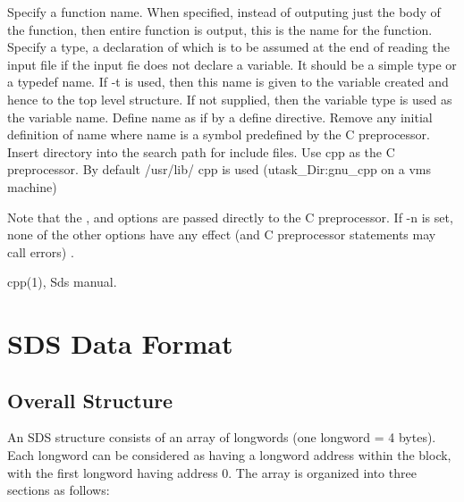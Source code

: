 \begin{manroutinedescription}
\begin{mandescription}
Specify a function name.  When specified, %
instead of
             outputing just the body of the function, then entire
             function is output, this is the name for the function.
Specify a type, a declaration of which is to be %
assumed
             at the end of reading the input file if the input fie
             does not declare a variable.  It should be a simple type
             or a typedef name.
If -t is used, then this name is given to the %
variable
             created and hence to the top level structure.  If not supplied,
             then the variable type is used as the variable name.
Define name as if by a {\mantt{\#{}}}define %
directive.
Remove any initial definition of name where name is a
		symbol predefined by the C preprocessor.
Insert directory into the search path for {%
\mantt{\#{}}}include files.
Use cpp as the C preprocessor.  By default /usr/lib/%
cpp
		is used (utask\_{}Dir:gnu\_{}cpp on a vms machine)

\end{mandescription}
      Note that the {}, {} and {} options are %
passed directly to the C
	preprocessor.  If -n is set, none of the other options have any
	effect (and C preprocessor statements may call errors)	.


	cpp(1), Sds manual.

\end{manroutinedescription}




\newpage
\section{SDS Data Format}
\label{SDS-format}

\subsection{Overall Structure}

An SDS structure consists of an array of longwords (one longword = 4 bytes).
Each longword can be considered as having a longword address within the block,
with the first longword having address 0. The array is organized into three
sections as follows:

